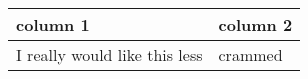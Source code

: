 \setlength{\tabcolsep}{0.5em} %
{\renewcommand{\arraystretch}{1.2}%
\begin{tabular}{|l|l|}
    \hline
    column 1 & column 2 \\ 
    \hline
    I really would like this less & crammed\\
    \hline
\end{tabular}
}
